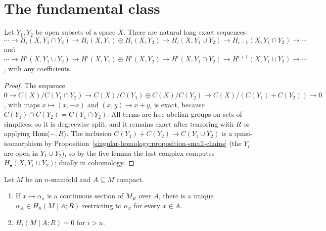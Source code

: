 \section{The fundamental class}\label{poincare-duality:section-fundamental-class}

\begin{lemma}\label{poincare-duality:lemma-relative-mayer-vietoris}
Let $Y_1, Y_2$ be open subsets of a space $X$. There are natural long exact sequences
\[
\cdots \to H_i(X, Y_1 \cap Y_2) \to H_i(X, Y_1) \oplus H_i(X, Y_2) \to H_i(X, Y_1 \cup Y_2) \to H_{i-1}(X, Y_1 \cap Y_2) \to \cdots
\]
and $\cdots \to H^i(X, Y_1 \cup Y_2) \to H^i(X, Y_1) \oplus H^i(X, Y_2) \to H^i(X, Y_1 \cap Y_2) \to H^{i+1}(X, Y_1 \cup Y_2) \to \cdots$, with any coefficients.
\end{lemma}

\begin{proof}
The sequence $0 \to C(X)/C(Y_1 \cap Y_2) \to C(X)/C(Y_1) \oplus C(X)/C(Y_2) \to C(X)/(C(Y_1) + C(Y_2)) \to 0$, with maps $x \mapsto (x, -x)$ and $(x, y) \mapsto x + y$, is
exact, because $C(Y_1) \cap C(Y_2) = C(Y_1 \cap Y_2)$. All terms are free abelian groups on sets of simplices, so it is degreewise split, and it remains exact after
tensoring with $R$ or applying $\operatorname{Hom}(-, R)$. The inclusion $C(Y_1) + C(Y_2) \to C(Y_1 \cup Y_2)$ is a quasi-isomorphism by
Proposition~\ref{singular-homology:proposition-small-chains} (the $Y_i$ are open in $Y_1 \cup Y_2$), so by the five lemma the last complex computes
$H_\bullet(X, Y_1 \cup Y_2)$; dually in cohomology.
\end{proof}

\begin{lemma}\label{poincare-duality:lemma-compact-sets}
Let $M$ be an $n$-manifold and $A \subseteq M$ compact.
\begin{enumerate}
\item If $x \mapsto \alpha_x$ is a continuous section of $M_R$ over $A$, there is a unique $\alpha_A \in H_n(M \mid A; R)$ restricting to $\alpha_x$ for every $x \in A$.
\item $H_i(M \mid A; R) = 0$ for $i > n$.
\end{enumerate}
\end{lemma}

